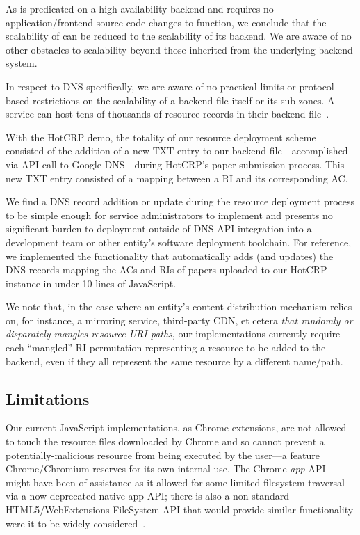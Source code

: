 As \SYSTEM{} is predicated on a high availability backend and
requires no application/frontend source code changes to function, we conclude
that the scalability of \SYSTEM{} can be reduced to the scalability of its
backend. We are aware of no other obstacles to scalability beyond those
inherited from the underlying backend system.

In respect to DNS specifically, we are aware of no practical limits or
protocol-based restrictions on the scalability of a backend file itself or its
sub-zones. A service can host tens of thousands of resource records in their
backend file~\cite{DNS1, DNS2}.

With the HotCRP demo, the totality of our resource deployment scheme consisted
of the addition of a new TXT entry to our backend file---accomplished via API
call to Google DNS---during HotCRP's paper submission process. This new TXT
entry consisted of a mapping between a RI and its corresponding AC.

We find a DNS record addition or update during the resource deployment process
to be simple enough for service administrators to implement and presents no
significant burden to deployment outside of DNS API integration into a
development team or other entity's software deployment toolchain. For reference,
we implemented the functionality that automatically adds (and updates) the DNS
records mapping the ACs and RIs of papers uploaded to our HotCRP instance in
under 10 lines of JavaScript.

We note that, in the case where an entity's content distribution mechanism
relies on, for instance, a mirroring service, third-party CDN, et cetera
\emph{that randomly or disparately mangles resource URI paths}, our
implementations currently require each ``mangled'' RI permutation representing a
resource to be added to the backend, even if they all represent the same
resource by a different name/path.

\subsection{Limitations}


Our current JavaScript implementations, as Chrome extensions, are not allowed to
touch the resource files downloaded by Chrome and so cannot prevent a
potentially-malicious resource from being executed by the user---a feature
Chrome/Chromium reserves for its own internal use. The Chrome \textit{app}
API~\cite{AppAPI} might have been of assistance as it allowed for some limited
filesystem traversal via a now deprecated native app API; there is also a
non-standard HTML5/WebExtensions FileSystem API that would provide similar
functionality were it to be widely considered~\cite{deadSpec}.

